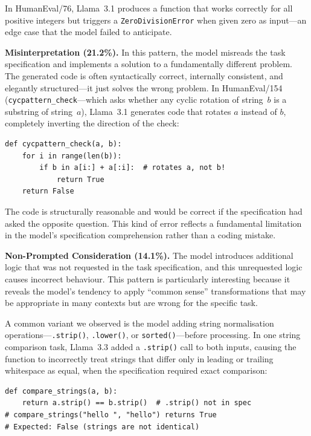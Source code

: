 \documentclass[smallextended]{svjour3}
\begin{document}
In HumanEval/76, Llama~3.1 produces a function that works correctly for all positive integers but triggers a \texttt{ZeroDivisionError} when given zero as input---an edge case that the model failed to anticipate.

\textbf{Misinterpretation (21.2\%).} In this pattern, the model misreads the task specification and implements a solution to a fundamentally different problem. The generated code is often syntactically correct, internally consistent, and elegantly structured---it just solves the wrong problem. In HumanEval/154 (\texttt{cycpattern\_check}---which asks whether any cyclic rotation of string~$b$ is a substring of string~$a$), Llama~3.1 generates code that rotates $a$ instead of $b$, completely inverting the direction of the check:

\begin{lstlisting}[caption={Misinterpretation: Llama~3.1 on HumanEval/154. The model rotates the wrong string, checking whether rotations of $a$ contain $b$ rather than checking whether rotations of $b$ appear in $a$.},label=lst:bug_misinterp]
def cycpattern_check(a, b):
    for i in range(len(b)):
        if b in a[i:] + a[:i]:  # rotates a, not b!
            return True
    return False
\end{lstlisting}

The code is structurally reasonable and would be correct if the specification had asked the opposite question. This kind of error reflects a fundamental limitation in the model's specification comprehension rather than a coding mistake.

\textbf{Non-Prompted Consideration (14.1\%).} The model introduces additional logic that was not requested in the task specification, and this unrequested logic causes incorrect behaviour. This pattern is particularly interesting because it reveals the model's tendency to apply ``common sense'' transformations that may be appropriate in many contexts but are wrong for the specific task.

A common variant we observed is the model adding string normalisation operations---\texttt{.strip()}, \texttt{.lower()}, or \texttt{sorted()}---before processing. In one string comparison task, Llama~3.3 added a \texttt{.strip()} call to both inputs, causing the function to incorrectly treat strings that differ only in leading or trailing whitespace as equal, when the specification required exact comparison:

\begin{lstlisting}[caption={Non-Prompted Consideration: Llama~3.3 adds an unrequested \texttt{.strip()} call that changes the comparison semantics.},label=lst:bug_npc]
def compare_strings(a, b):
    return a.strip() == b.strip()  # .strip() not in spec
# compare_strings("hello ", "hello") returns True
# Expected: False (strings are not identical)
\end{lstlisting}
\end{document}
